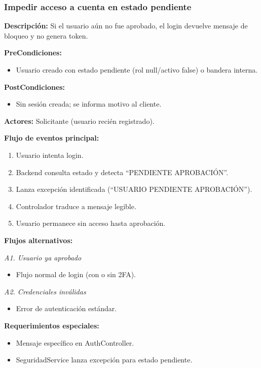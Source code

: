 \subsubsection{Impedir acceso a cuenta en estado pendiente}

\textbf{Descripción:} Si el usuario aún no fue aprobado, el login devuelve mensaje de bloqueo y no genera token.

\vspace{0.5em}
\noindent\textbf{PreCondiciones:}
\begin{itemize}[nosep]
    \item Usuario creado con estado pendiente (rol null/activo false) o bandera interna.
\end{itemize}

\vspace{0.5em}
\noindent\textbf{PostCondiciones:}
\begin{itemize}[nosep]
    \item Sin sesión creada; se informa motivo al cliente.
\end{itemize}

\vspace{0.5em}
\noindent\textbf{Actores:} Solicitante (usuario recién registrado).

\vspace{0.5em}
\noindent\textbf{Flujo de eventos principal:}
\begin{enumerate}[nosep]
    \item Usuario intenta login.
    \item Backend consulta estado y detecta ``PENDIENTE APROBACIÓN''.
    \item Lanza excepción identificada (``USUARIO PENDIENTE APROBACIÓN'').
    \item Controlador traduce a mensaje legible.
    \item Usuario permanece sin acceso hasta aprobación.
\end{enumerate}

\vspace{0.5em}
\noindent\textbf{Flujos alternativos:}

\vspace{0.3em}
\noindent\textit{A1. Usuario ya aprobado}
\begin{itemize}[nosep]
    \item Flujo normal de login (con o sin 2FA).
\end{itemize}

\vspace{0.3em}
\noindent\textit{A2. Credenciales inválidas}
\begin{itemize}[nosep]
    \item Error de autenticación estándar.
\end{itemize}

\vspace{0.5em}
\noindent\textbf{Requerimientos especiales:}
\begin{itemize}[nosep]
    \item Mensaje específico en AuthController.
    \item SeguridadService lanza excepción para estado pendiente.
\end{itemize}
